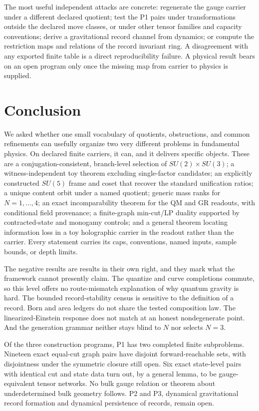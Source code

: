\documentclass[11pt]{article}
\theoremstyle{definition}
\begin{document}
The most useful independent attacks are concrete: regenerate the gauge carrier under a different declared quotient;
test the P1 pairs under transformations outside the declared move classes, or under other tensor families and capacity
conventions; derive a gravitational record channel from dynamics; or compute the restriction maps and relations of the
record invariant ring. A disagreement with any exported finite table is a direct reproducibility failure. A physical
result bears on an open program only once the missing map from carrier to physics is supplied.
 \section{Conclusion}\label{conclusion}

We asked whether one small vocabulary of quotients, obstructions, and common refinements can usefully organize two
very different problems in fundamental physics. On declared finite carriers, it can, and it delivers specific objects.
These are a conjugation-consistent, branch-level selection of \(SU(2)\times SU(3)\); a witness-independent toy theorem
excluding single-factor candidates; an explicitly constructed \(SU(5)\) frame and coset that recover the standard
unification ratios; a unique content orbit under a named quotient; generic mass ranks for \(N=1,\dots,4\); an exact
incomparability theorem for the QM and GR readouts, with conditional field provenance; a finite-graph min-cut/LP
duality supported by contracted-state and monogamy controls; and a general theorem locating information loss in a
toy holographic carrier in the readout rather than the carrier. Every statement carries its caps, conventions, named
inputs, sample bounds, or depth limits.

The negative results are results in their own right, and they mark what the framework cannot presently claim. The
quantize and curve completions commute, so this level offers no route-mismatch explanation of why quantum gravity is
hard. The bounded record-stability census is sensitive to the definition of a record. Born and area ledgers do not share
the tested composition law. The linearized-Einstein response does not match at an honest nondegenerate point. And the
generation grammar neither stays blind to \(N\) nor selects \(N=3\).

Of the three construction programs, P1 has two completed finite subproblems. Nineteen exact equal-cut graph pairs have
disjoint forward-reachable sets, with disjointness under the symmetric closure still open. Six exact state-level pairs
with identical cut and state data turn out, by a general lemma, to be gauge-equivalent tensor networks. No bulk gauge
relation or theorem about underdetermined bulk geometry follows. P2 and P3, dynamical gravitational record formation
and dynamical persistence of records, remain open.
\end{document}
